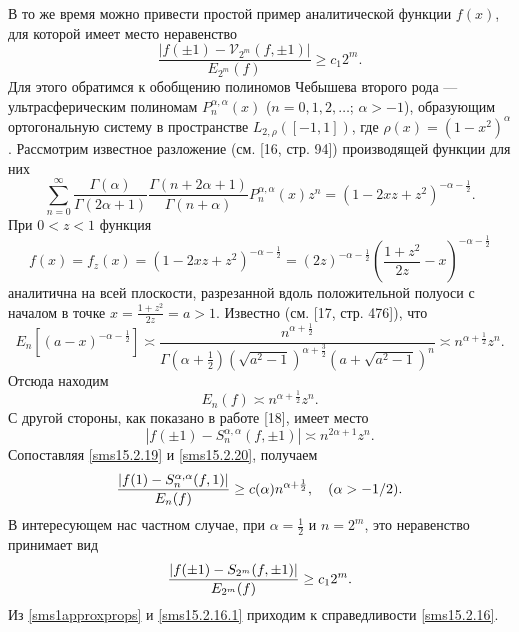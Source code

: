 \documentclass[12pt]{book}
\begin{document}
В то же время можно привести простой пример аналитической функции $f(x)$, для которой имеет место неравенство
\begin{equation}
\label{sms15.2.16}
\frac{|f(\pm1)-\mathcal{V}_{2^m}(f, \pm1)|}{ E_{2^m}(f)}\ge
c_1 2^m.
\end{equation}
Для этого обратимся к обобщению полиномов Чебышева второго рода --- ультрасферическим полиномам $P_n^{\alpha, \alpha}(x)$ ($n =0,1,2,\ldots$; $\alpha > -1$), образующим ортогональную систему в пространстве $L_{2, \rho}([-1,1])$, где $\rho(x)=(1-x^2)^{\alpha}$.
Рассмотрим известное разложение (см. [16, стр. 94])
производящей функции для них
\begin{equation}
\label{sms15.2.17}
\sum_{n=0}^\infty\frac{\Gamma(\alpha)}{\Gamma(2\alpha+1)}\frac{
     \Gamma(n+2\alpha+1)}{\Gamma(n+\alpha)}P_n^{\alpha,\alpha}(x)
     z^n=(1-2xz+z^2)^{-\alpha-\frac12}.
\end{equation}
При $0<z<1$ функция
\begin{equation}
\label{sms15.2.18}
f(x)=f_z(x)=(1-2xz+z^2)^{-\alpha-\frac12}=(2z)^{-\alpha-\frac12}
     \left({\frac{1+z^2}{2z}}-x\right)^{-\alpha-\frac12}
\end{equation}
аналитична  на всей плоскости,  разрезанной вдоль положительной полуоси с началом в точке $x=\frac{1+z^2}{2z}=a>1$. Известно (см. [17, стр. 476]),
что
\begin{equation}
 E_n[(a-x)^{-\alpha-\frac12}]\asymp \frac{n^{\alpha+\frac12}}{
\Gamma\left(\alpha+\frac12\right)(\sqrt{a^2-1})^{\alpha+\frac32}(a+\sqrt{a^2-1})^n}
     \asymp n^{\alpha+\frac12}z^n.
\end{equation}
Отсюда находим
\begin{equation}
\label{sms15.2.19}
E_n(f)\asymp n^{\alpha+\frac12}z^n.
\end{equation}
С другой стороны, как показано в работе [18],
имеет место
\begin{equation}
\label{sms15.2.20}
|f(\pm1)- S_n^{\alpha,\alpha}(f,\pm1)| \asymp n^{2\alpha+1}z^n.
\end{equation}
Сопоставляя \eqref{sms15.2.19} и \eqref{sms15.2.20}, получаем
\begin{equation*}
\label{sms15.2.21}
{|f(1)-S_n^{\alpha,\alpha}(f, 1)|\over E_n(f)}\ge
c(\alpha)n^{\alpha+\frac12}, \quad (\alpha>-1/2).
\end{equation*}
В интересующем нас частном случае, при $\alpha=\frac12$ и $n = 2^m$, это неравенство принимает вид
\begin{equation}
\label{sms15.2.16.1}
{|f(\pm1)-S_{2^m}(f, \pm1)|\over E_{2^m}(f)} \ge c_1 2^m.
\end{equation}
Из \eqref{sms1approxprops} и \eqref{sms15.2.16.1} приходим к справедливости \eqref{sms15.2.16}.
\end{document}
